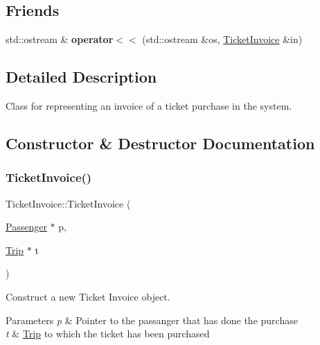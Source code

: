 \subsection*{Friends}
\begin{DoxyCompactItemize}
\item 
\mbox{\label{classTicketInvoice_ae78ba81ba79ed7e8c9e8cd23a910f00d}} 
std\+::ostream \& {\bfseries operator$<$$<$} (std\+::ostream \&os, \mbox{\hyperlink{classTicketInvoice}{Ticket\+Invoice}} \&in)
\end{DoxyCompactItemize}


\subsection{Detailed Description}
Class for representing an invoice of a ticket purchase in the system. 

\subsection{Constructor \& Destructor Documentation}
\mbox{\label{classTicketInvoice_a38b37e5168ce71bbf37aceef8a6f6267}} 
\subsubsection{\texorpdfstring{Ticket\+Invoice()}{TicketInvoice()}}
{\footnotesize\ttfamily Ticket\+Invoice\+::\+Ticket\+Invoice (\begin{DoxyParamCaption}\item[{\mbox{\hyperlink{classPassenger}{Passenger}} $\ast$}]{p,  }\item[{\mbox{\hyperlink{classTrip}{Trip}} $\ast$}]{t }\end{DoxyParamCaption})}



Construct a new Ticket Invoice object. 


\begin{DoxyParams}{Parameters}
{\em p} & Pointer to the passanger that has done the purchase \\
\hline
{\em t} & \mbox{\hyperlink{classTrip}{Trip}} to which the ticket has been purchased \\
\hline
\end{DoxyParams}


